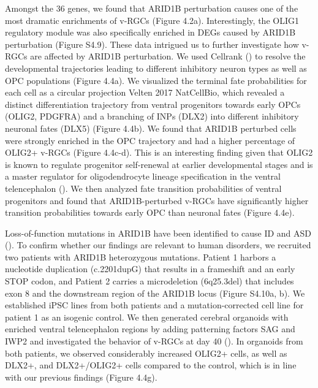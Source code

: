 Amongst the 36 genes, we found that ARID1B perturbation causes one of the most dramatic enrichments of v-RGCs (Figure 4.2a). Interestingly, the OLIG1 regulatory module was also specifically enriched in DEGs caused by ARID1B perturbation (Figure S4.9). These data intrigued us to further investigate how v-RGCs are affected by ARID1B perturbation. We used Cellrank (\cite{lange_cellrank_2022}) to resolve the developmental trajectories leading to different inhibitory neuron types as well as OPC populations (Figure 4.4a). We visualized the terminal fate probabilities for each cell as a circular projection {Velten 2017 NatCellBio}, which revealed a distinct differentiation trajectory from ventral progenitors towards early OPCs (OLIG2, PDGFRA) and a branching of INPs (DLX2) into different inhibitory neuronal fates (DLX5) (Figure 4.4b). We found that ARID1B perturbed cells were strongly enriched in the OPC trajectory and had a higher percentage of OLIG2+ v-RGCs (Figure 4.4c-d). This is an interesting finding given that OLIG2 is known to regulate progenitor self-renewal at earlier developmental stages and is a master regulator for oligodendrocyte lineage specification in the ventral telencephalon (\cite{petryniak_dlx1_2007,sun_phosphorylation_2011}). We then analyzed fate transition probabilities of ventral progenitors and found that ARID1B-perturbed v-RGCs have significantly higher transition probabilities towards early OPC than neuronal fates (Figure 4.4e).

Loss-of-function mutations in ARID1B have been identified to cause ID and ASD (\cite{moffat_neurobiology_2022,satterstrom_large-scale_2020}). To confirm whether our findings are relevant to human disorders, we recruited two patients with ARID1B heterozygous mutations. Patient 1 harbors a nucleotide duplication (c.2201dupG) that results in a frameshift and an early STOP codon, and Patient 2 carries a microdeletion (6q25.3del) that includes exon 8 and the downstream region of the ARID1B locus (Figure S4.10a, b). We established iPSC lines from both patients and a mutation-corrected cell line for patient 1 as an isogenic control. We then generated cerebral organoids with enriched ventral telencephalon regions by adding patterning factors SAG and IWP2 and investigated the behavior of v-RGCs at day 40 (\cite{bagley_fused_2017}). In organoids from both patients, we observed considerably increased OLIG2+ cells, as well as DLX2+, and DLX2+/OLIG2+ cells compared to the control, which is in line with our previous findings (Figure 4.4g). 

